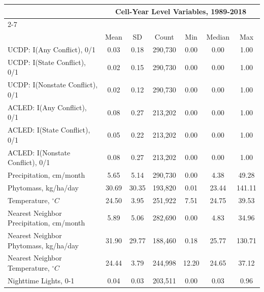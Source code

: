 {
\def\sym#1{\ifmmode^{#1}\else\(^{#1}\)\fi}
\begin{tabular}{l*{1}{cccccc}}
\toprule
     &\multicolumn{6}{c}{Cell-Year Level Variables, 1989-2018}                     \\\cmidrule(lr){2-7}
     &\multicolumn{6}{c}{}                                                         \\
     &        Mean&          SD&       Count&         Min&      Median&         Max\\
\midrule
UCDP: I(Any Conflict), 0/1&        0.03&        0.18&     290,730&        0.00&        0.00&        1.00\\
UCDP: I(State Conflict), 0/1&        0.02&        0.15&     290,730&        0.00&        0.00&        1.00\\
UCDP: I(Nonstate Conflict), 0/1&        0.02&        0.12&     290,730&        0.00&        0.00&        1.00\\
ACLED: I(Any Conflict), 0/1&        0.08&        0.27&     213,202&        0.00&        0.00&        1.00\\
ACLED: I(State Conflict), 0/1&        0.05&        0.22&     213,202&        0.00&        0.00&        1.00\\
ACLED: I(Nonstate Conflict), 0/1&        0.08&        0.27&     213,202&        0.00&        0.00&        1.00\\
Precipitation, cm/month&        5.65&        5.14&     290,730&        0.00&        4.38&       49.28\\
Phytomass, kg/ha/day&       30.69&       30.35&     193,820&        0.01&       23.44&      141.11\\
Temperature, $^{\circ}C$&       24.50&        3.95&     251,922&        7.51&       24.75&       39.53\\
Nearest Neighbor Precipitation, cm/month&        5.89&        5.06&     282,690&        0.00&        4.83&       34.96\\
Nearest Neighbor Phytomass, kg/ha/day&       31.90&       29.77&     188,460&        0.18&       25.77&      130.71\\
Nearest Neighbor Temperature, $^{\circ}C$&       24.44&        3.79&     244,998&       12.20&       24.65&       37.12\\
Nighttime Lights, 0-1&        0.04&        0.03&     203,511&        0.00&        0.03&        0.96\\
\bottomrule
\end{tabular}
}
